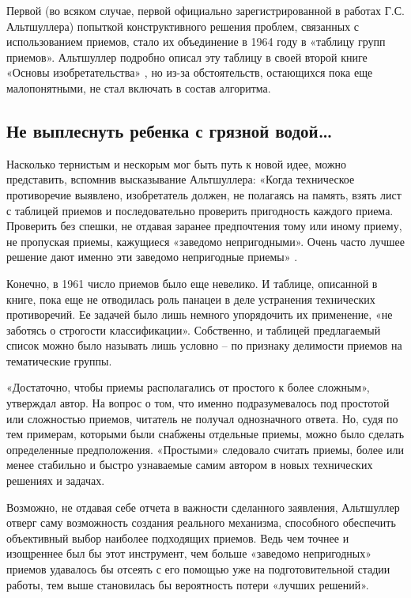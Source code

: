 \documentclass[11pt,a4paper]{article}
\begin{document}
Первой (во всяком случае, первой официально зарегистрированной в работах
Г.С. Альтшуллера) попыткой конструктивного решения проблем, связанных с
использованием приемов, стало их объединение в 1964 году в «таблицу групп
приемов». Альтшуллер подробно описал эту таблицу в своей второй книге «Основы
изобретательства» \cite{Altshuller1964}, но из-за обстоятельств, остающихся
пока еще малопонятными, не стал включать в состав алгоритма.

\subsection*{Не выплеснуть ребенка с грязной водой…}

Насколько тернистым и нескорым мог быть путь к новой идее, можно представить,
вспомнив высказывание Альтшуллера: «Когда техническое противоречие выявлено,
изобретатель должен, не полагаясь на память, взять лист с таблицей приемов и
последовательно проверить пригодность каждого приема. Проверить без спешки, не
отдавая заранее предпочтения тому или иному приему, не пропуская приемы,
кажущиеся «заведомо непригодными». Очень часто лучшее решение дают именно эти
заведомо непригодные приемы» \cite{Altshuller1961}.

Конечно, в 1961 число приемов было еще невелико. И таблице, описанной в книге,
пока еще не отводилась роль панацеи в деле устранения технических
противоречий. Ее задачей было лишь немного упорядочить их применение, «не
заботясь о строгости классификации». Собственно, и таблицей предлагаемый
список можно было называть лишь условно -- по признаку делимости приемов на
тематические группы.

«Достаточно, чтобы приемы располагались от простого к более сложным»,
утверждал автор. На вопрос о том, что именно подразумевалось под простотой или
сложностью приемов, читатель не получал однозначного ответа. Но, судя по тем
примерам, которыми были снабжены отдельные приемы, можно было сделать
определенные предположения. «Простыми» следовало считать приемы, более или
менее стабильно и быстро узнаваемые самим автором в новых технических решениях
и задачах.

Возможно, не отдавая себе отчета в важности сделанного заявления, Альтшуллер
отверг саму возможность создания реального механизма, способного обеспечить
объективный выбор наиболее подходящих приемов. Ведь чем точнее и изощреннее
был бы этот инструмент, чем больше «заведомо непригодных» приемов удавалось бы
отсеять с его помощью уже на подготовительной стадии работы, тем выше
становилась бы вероятность потери «лучших решений».
\end{document}
